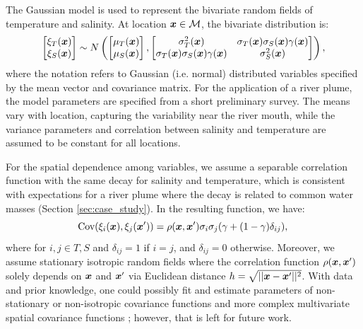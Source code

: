 \documentclass[aoas]{imsart}
\begin{document}
The Gaussian model is used to represent the bivariate random fields of
temperature and salinity. At location ${\boldsymbol x} \in \mathcal{M}$, the
bivariate distribution is:
\begin{equation}\label{gp_bar}
  \begin{bmatrix}\xi_T(\bx) \\
    \xi_S(\bx) \end{bmatrix}
 \sim N \left( 
\begin{bmatrix} \mu_{T}(\bx)\\
\mu_{S}(\bx)
\end{bmatrix},\begin{bmatrix}
\sigma_{T}^2(\bx) & \sigma_{T}(\bx) \sigma_S(\bx) \gamma(\bx)  \\
\sigma_{T}(\bx) \sigma_S(\bx) \gamma(\bx)  & \sigma_{S}^2(\bx) 
\end{bmatrix}
\right),
\end{equation}
where the notation refers to Gaussian (i.e. normal) distributed
variables specified by the mean vector and covariance matrix. For the
application of a river plume, the model parameters are specified from
a short preliminary survey. The means vary with location, capturing
the variability near the river mouth, while the variance parameters
and correlation between salinity and temperature are assumed to be
constant for all locations. %

For the spatial dependence among variables, we assume a separable
correlation function with the same decay for salinity and temperature,
which is consistent with expectations for a river plume where the
decay is related to common water masses (Section
\ref{sec:case_study}). In the resulting function, we have:
\begin{equation}\label{gp_corr}
\mbox{Cov}(\xi_i(\bx),\xi_j(\bx')) = \rho(\bx,\bx') \sigma_i \sigma_j (\gamma +(1-\gamma )\delta_{ij}), \\
\end{equation}
where for $i,j \in {T,S}$ and $\delta_{ij}=1$ if $i=j$, and
$\delta_{ij}=0$ otherwise. Moreover, we assume stationary isotropic
random fields where the correlation function $\rho({\boldsymbol x},{\boldsymbol x}')$
solely depends on ${\boldsymbol x}$ and ${\boldsymbol x}'$ via Euclidean distance
$h=\sqrt{||{\boldsymbol x}-{\boldsymbol x}'||^2}$. With data and prior knowledge, one could
possibly fit and estimate parameters of non-stationary or
non-isotropic covariance functions and more complex multivariate
spatial covariance functions
\citep{gneiting2010matern,genton2015cross}; however, that is left for
future work.
\end{document}
